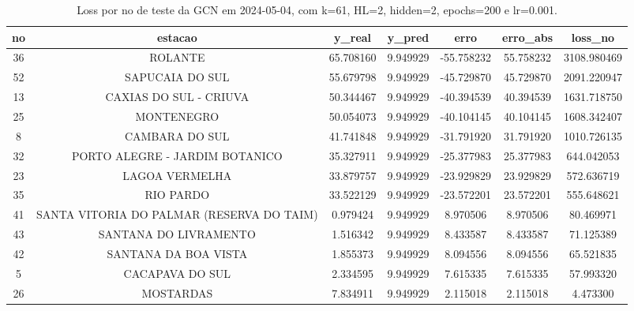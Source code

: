\begin{table}[h]
\centering
\caption{Loss por no de teste da GCN em 2024-05-04, com k=61, HL=2, hidden=2, epochs=200 e lr=0.001.}
\label{tab:gcn_loss_k61_hl2_h2_e200_d20240504}
\begin{tabular}{ccccccc}
\toprule
no & estacao & y\_real & y\_pred & erro & erro\_abs & loss\_no \\
\midrule
36 & ROLANTE & 65.708160 & 9.949929 & -55.758232 & 55.758232 & 3108.980469 \\
52 & SAPUCAIA DO SUL & 55.679798 & 9.949929 & -45.729870 & 45.729870 & 2091.220947 \\
13 & CAXIAS DO SUL - CRIUVA & 50.344467 & 9.949929 & -40.394539 & 40.394539 & 1631.718750 \\
25 & MONTENEGRO & 50.054073 & 9.949929 & -40.104145 & 40.104145 & 1608.342407 \\
8 & CAMBARA DO SUL & 41.741848 & 9.949929 & -31.791920 & 31.791920 & 1010.726135 \\
32 & PORTO ALEGRE - JARDIM BOTANICO & 35.327911 & 9.949929 & -25.377983 & 25.377983 & 644.042053 \\
23 & LAGOA VERMELHA & 33.879757 & 9.949929 & -23.929829 & 23.929829 & 572.636719 \\
35 & RIO PARDO & 33.522129 & 9.949929 & -23.572201 & 23.572201 & 555.648621 \\
41 & SANTA VITORIA DO PALMAR (RESERVA DO TAIM) & 0.979424 & 9.949929 & 8.970506 & 8.970506 & 80.469971 \\
43 & SANTANA DO LIVRAMENTO & 1.516342 & 9.949929 & 8.433587 & 8.433587 & 71.125389 \\
42 & SANTANA DA BOA VISTA & 1.855373 & 9.949929 & 8.094556 & 8.094556 & 65.521835 \\
5 & CACAPAVA DO SUL & 2.334595 & 9.949929 & 7.615335 & 7.615335 & 57.993320 \\
26 & MOSTARDAS & 7.834911 & 9.949929 & 2.115018 & 2.115018 & 4.473300 \\
\bottomrule
\end{tabular}
\end{table}
